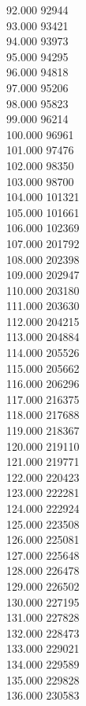 { 92.000	92944 \\
 93.000	93421 \\
 94.000	93973 \\
 95.000	94295 \\
 96.000	94818 \\
 97.000	95206 \\
 98.000	95823 \\
 99.000	96214 \\
 100.000	96961 \\
 101.000	97476 \\
 102.000	98350 \\
 103.000	98700 \\
 104.000	101321 \\
 105.000	101661 \\
 106.000	102369 \\
 107.000	201792 \\
 108.000	202398 \\
 109.000	202947 \\
 110.000	203180 \\
 111.000	203630 \\
 112.000	204215 \\
 113.000	204884 \\
 114.000	205526 \\
 115.000	205662 \\
 116.000	206296 \\
 117.000	216375 \\
 118.000	217688 \\
 119.000	218367 \\
 120.000	219110 \\
 121.000	219771 \\
 122.000	220423 \\
 123.000	222281 \\
 124.000	222924 \\
 125.000	223508 \\
 126.000	225081 \\
 127.000	225648 \\
 128.000	226478 \\
 129.000	226502 \\
 130.000	227195 \\
 131.000	227828 \\
 132.000	228473 \\
 133.000	229021 \\
 134.000	229589 \\
 135.000	229828 \\
 136.000	230583 \\
}
